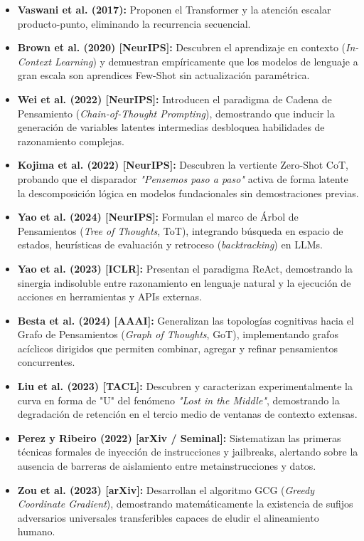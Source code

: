 \begin{itemize}[leftmargin=1.5em, itemsep=0.25em]
    \item \textbf{Vaswani et al. (2017):} Proponen el Transformer y la atención escalar producto-punto, eliminando la recurrencia secuencial.
    \item \textbf{Brown et al. (2020) [NeurIPS]:} Descubren el aprendizaje en contexto (\textit{In-Context Learning}) y demuestran empíricamente que los modelos de lenguaje a gran escala son aprendices Few-Shot sin actualización paramétrica.
    \item \textbf{Wei et al. (2022) [NeurIPS]:} Introducen el paradigma de Cadena de Pensamiento (\textit{Chain-of-Thought Prompting}), demostrando que inducir la generación de variables latentes intermedias desbloquea habilidades de razonamiento complejas.
    \item \textbf{Kojima et al. (2022) [NeurIPS]:} Descubren la vertiente Zero-Shot CoT, probando que el disparador \textit{"Pensemos paso a paso"} activa de forma latente la descomposición lógica en modelos fundacionales sin demostraciones previas.
    \item \textbf{Yao et al. (2024) [NeurIPS]:} Formulan el marco de Árbol de Pensamientos (\textit{Tree of Thoughts}, ToT), integrando búsqueda en espacio de estados, heurísticas de evaluación y retroceso (\textit{backtracking}) en LLMs.
    \item \textbf{Yao et al. (2023) [ICLR]:} Presentan el paradigma ReAct, demostrando la sinergia indisoluble entre razonamiento en lenguaje natural y la ejecución de acciones en herramientas y APIs externas.
    \item \textbf{Besta et al. (2024) [AAAI]:} Generalizan las topologías cognitivas hacia el Grafo de Pensamientos (\textit{Graph of Thoughts}, GoT), implementando grafos acíclicos dirigidos que permiten combinar, agregar y refinar pensamientos concurrentes.
    \item \textbf{Liu et al. (2023) [TACL]:} Descubren y caracterizan experimentalmente la curva en forma de "U" del fenómeno \textit{"Lost in the Middle"}, demostrando la degradación de retención en el tercio medio de ventanas de contexto extensas.
    \item \textbf{Perez y Ribeiro (2022) [arXiv / Seminal]:} Sistematizan las primeras técnicas formales de inyección de instrucciones y jailbreaks, alertando sobre la ausencia de barreras de aislamiento entre metainstrucciones y datos.
    \item \textbf{Zou et al. (2023) [arXiv]:} Desarrollan el algoritmo GCG (\textit{Greedy Coordinate Gradient}), demostrando matemáticamente la existencia de sufijos adversarios universales transferibles capaces de eludir el alineamiento humano.
\end{itemize}

